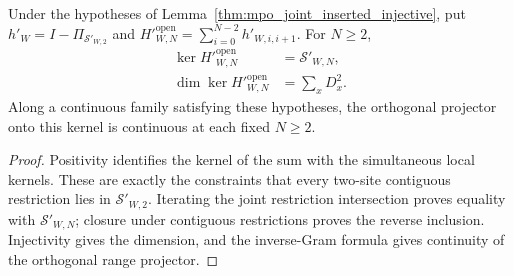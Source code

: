 \begin{lemma}
    \label{thm:mpo_joint_inserted_open_kernel}
    \leanok
    Under the hypotheses of Lemma~\ref{thm:mpo_joint_inserted_injective},
    put $h'_W=I-\Pi_{\mathcal S'_{W,2}}$ and
    $H'^{\mathrm{open}}_{W,N}=\sum_{i=0}^{N-2}h'_{W,i,i+1}$.
    For $N\geq2$,
    \begin{align}
        \ker H'^{\mathrm{open}}_{W,N}     & =\mathcal S'_{W,N}, \\
        \dim\ker H'^{\mathrm{open}}_{W,N} & =\sum_xD_x^2.
    \end{align}
    Along a continuous family satisfying these hypotheses, the orthogonal
    projector onto this kernel is continuous at each fixed $N\geq2$.
\end{lemma}
\begin{proof}
    \leanok
    Positivity identifies the kernel of the sum with the simultaneous
    local kernels. These are exactly the constraints that every two-site
    contiguous restriction lies in $\mathcal S'_{W,2}$.
    Iterating the joint restriction intersection proves equality with
    $\mathcal S'_{W,N}$; closure under contiguous restrictions proves the
    reverse inclusion. Injectivity gives the dimension, and the inverse-Gram
    formula gives continuity of the orthogonal range projector.
\end{proof}
